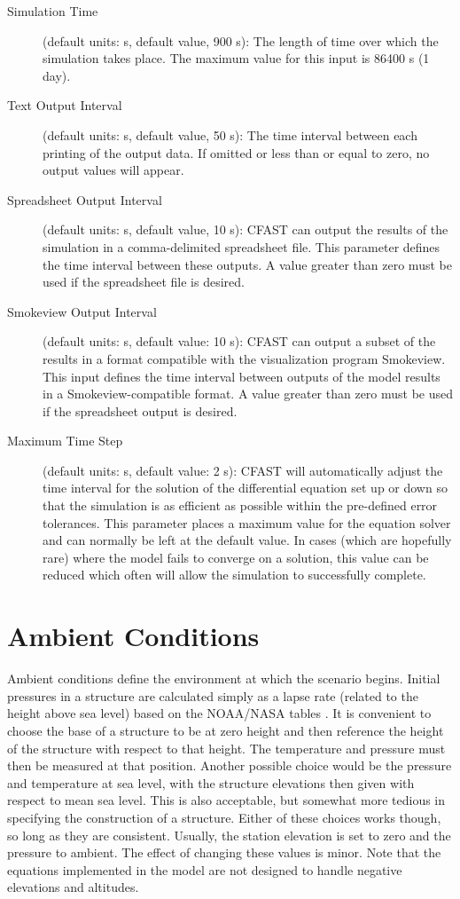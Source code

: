 \begin{description}
\item[Simulation Time] (default units: s, default value, 900 s): The length of time over which the simulation takes place. The maximum value for this input is 86400 s (1 day).

\item[Text Output Interval] (default units: s, default value, 50 s): The time interval between each printing of the output data.  If omitted or less than or equal to zero, no output values will appear.

\item[Spreadsheet Output Interval] (default units: s, default value, 10 s): CFAST can output the results of the simulation in a comma-delimited spreadsheet file. This parameter defines the time interval between these outputs. A value greater than zero must be used if the spreadsheet file is desired.

\item[Smokeview Output Interval] (default units: s, default value: 10 s): CFAST can output a subset of the results in a format compatible with the visualization program Smokeview. This input defines the time interval between outputs of the model results in a Smokeview-compatible format.  A value greater than zero must be used if the spreadsheet output is desired.

\item[Maximum Time Step] (default units: s, default value: 2 s): CFAST will automatically adjust the time interval for the solution of the differential equation set up or down so that the simulation is as efficient as possible within the pre-defined error tolerances. This parameter places a maximum value for the equation solver and can normally be left at the default value. In cases (which are hopefully rare) where the model fails to converge on a solution, this value can be reduced which often will allow the simulation to successfully complete.
\end{description}

\section{Ambient Conditions}

Ambient conditions define the environment at which the scenario begins. Initial pressures in a structure are calculated simply as a lapse rate (related to the height above sea level) based on the NOAA/NASA tables \cite{GPO:Atmosphere}. It is convenient to choose the base of a structure to be at zero height and then reference the height of the structure with respect to that height.  The temperature and pressure must then be measured at that position.  Another possible choice would be the pressure and temperature at sea level, with the structure elevations then given with respect to mean sea level.  This is also acceptable, but somewhat more tedious in specifying the construction of a structure.  Either of these choices works though, so long as they are consistent. Usually, the station elevation is set to zero and the pressure to ambient. The effect of changing these values is minor. Note that the equations implemented in the model are not designed to handle negative elevations and altitudes.

